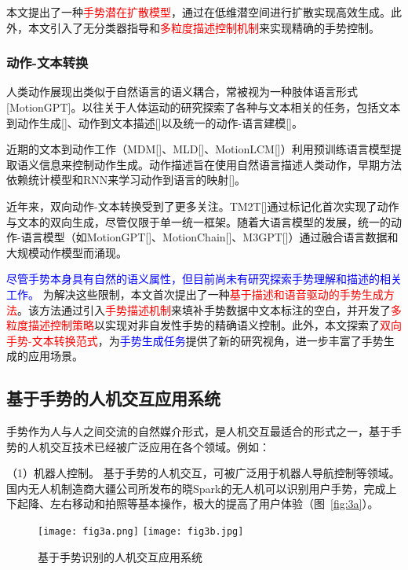 本文提出了一种\textcolor{red}{手势潜在扩散模型}，通过在低维潜空间进行扩散实现高效生成。此外，本文引入了无分类器指导和\textcolor{red}{多粒度描述控制机制}来实现精确的手势控制。

\subsubsection{动作-文本转换}
人类动作展现出类似于自然语言的语义耦合，常被视为一种肢体语言形式[MotionGPT]。以往关于人体运动的研究探索了各种与文本相关的任务，包括文本到动作生成[]、动作到文本描述[]以及统一的动作-语言建模[]。

近期的文本到动作工作（MDM[]、MLD[]、MotionLCM[]）利用预训练语言模型提取语义信息来控制动作生成。动作描述旨在使用自然语言描述人类动作，早期方法依赖统计模型和RNN来学习动作到语言的映射[]。

近年来，双向动作-文本转换受到了更多关注。TM2T[]通过标记化首次实现了动作与文本的双向生成，尽管仅限于单一统一框架。随着大语言模型的发展，统一的动作-语言模型（如MotionGPT[]、MotionChain[]、M3GPT[]）通过融合语言数据和大规模动作模型而涌现。

\textcolor{blue}{尽管手势本身具有自然的语义属性，但目前尚未有研究探索手势理解和描述的相关工作。}
为解决这些限制，本文首次提出了一种\textcolor{red}{基于描述和语音驱动的手势生成方法}。该方法通过引入\textcolor{red}{手势描述机制}来填补手势数据中文本标注的空白，并开发了\textcolor{red}{多粒度描述控制策略}以实现对非自发性手势的精确语义控制。此外，本文探索了\textcolor{red}{双向手势-文本转换范式}，为\textcolor{blue}{手势生成任务}提供了新的研究视角，进一步丰富了手势生成的应用场景。



\subsection{基于手势的人机交互应用系统}
手势作为人与人之间交流的自然媒介形式，是人机交互最适合的形式之一\cite{oudah2020hand}，基于手势的人机交互技术已经被广泛应用在各个领域。例如：

（1）机器人控制。 基于手势的人机交互，可被广泛用于机器人导航控制等领域\cite{al20223d}。国内无人机制造商大疆公司所发布的晓Spark的无人机可以识别用户手势，完成上下起降、左右移动和拍照等基本操作，极大的提高了用户体验（图~\ref{fig:3a}）。

\begin{figure}
  \centering
    {\texttt{[image: fig3a.png]}}
    {\texttt{[image: fig3b.jpg]}}
  \caption{基于手势识别的人机交互应用系统}
  \label{fig:HCI_system}
\end{figure}

